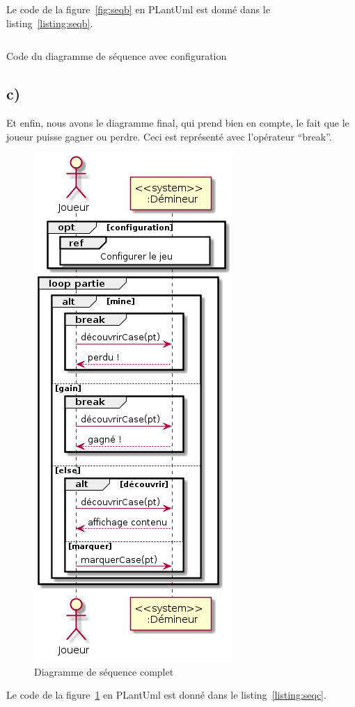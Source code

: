 \documentclass[a4paper,12pt]{article}
\begin{document}
Le code de la figure~\ref{fig:seqb} en PLantUml est donné dans le listing~\ref{listing:seqb}.

\begin{listing}[ht]
    \inputminted[bgcolor=lightgray!40,linenos=true]{fsharp}{./code-images/q2-b}
    \caption{Code du diagramme de séquence avec configuration}
    \label{listing:seqb}
\end{listing}

\clearpage

\subsection{c)}\label{c}

Et enfin, nous avons le diagramme final, qui prend bien en compte, le fait que le joueur puisse gagner ou perdre. Ceci est représenté avec l'opérateur ``break''.

\begin{figure}[htbp]
    \centering
    \includegraphics[width=.4\textwidth]{./images/q2-c.png}
    \caption{Diagramme de séquence complet}
    \label{fig:seqc}
\end{figure}

\clearpage

Le code de la figure~\ref{fig:seqc} en PLantUml est donné dans le listing~\ref{listing:seqc}.
\end{document}
